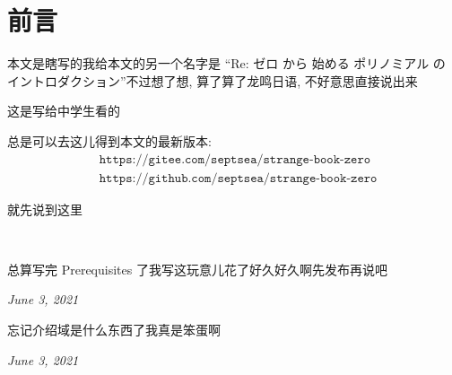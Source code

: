 \section*{前言}

本文是瞎写的\period 我给本文的另一个名字是 ``Re: ゼロ から 始める ポリノミアル の イントロダクション''\period 不过想了想, 算了算了\period 龙鸣日语, 不好意思直接说出来\period

这是写给中学生看的\period

总是可以去这儿得到本文的最新版本:
\begin{align*}
    & \texttt{https://gitee.com/septsea/strange-book-zero} \\
    & \texttt{https://github.com/septsea/strange-book-zero}
\end{align*}

就先说到这里\period

\ \

\providecommand{\appendDate}{}
\renewcommand{\appendDate}[1]{\par \hfill {\itshape \sffamily #1}}

\begin{remark}
    总算写完 Prerequisites 了\period 我写这玩意儿花了好久好久啊\period 先发布再说吧\period
    \appendDate{June 3, 2021}
\end{remark}

\begin{remark}
    忘记介绍域是什么东西了\period 我真是笨蛋啊\period
    \appendDate{June 3, 2021}
\end{remark}
